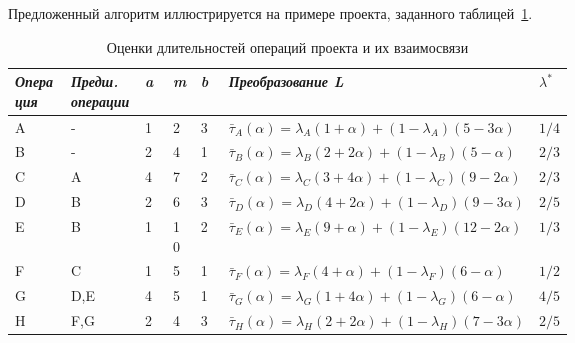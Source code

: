 Предложенный алгоритм иллюстрируется на примере проекта, заданного таблицей~\ref{t:sample-project-estimates}.
\begin{table}[h!]
\caption{Оценки длительностей операций проекта и их взаимосвязи}
\label{t:sample-project-estimates}
\begin{center}
\begin{tabularx}{\textwidth}{|p{0.1\linewidth}|X|p{0.05\linewidth}|p{0.05\linewidth}|p{0.05\linewidth}|p{0.4\linewidth}|X|}
	\hline
		\centering \textit{Операция} & \centering \textit{Предш. операции} & \centering \textit{a} & \centering \textit{m} & \centering \textit{b}  & \centering \textit{Преобразование L} & \centering $\lambda^*$ \tabularnewline	\hline
	\hline
		A & -   & 1 & 2  & 3 & $\bar{\tau}_A\left( \alpha \right)=\lambda_A\left( 1+\alpha \right)+\left( 1-\lambda_A \right)\left( 5-3\alpha \right)$ & $1/4$ \tabularnewline \hline
		B & -   & 2 & 4  & 1 & $\bar{\tau}_B\left( \alpha \right)=\lambda_B\left( 2+2\alpha \right)+\left( 1-\lambda_B \right)\left( 5-\alpha \right)$ & $2/3$ \tabularnewline \hline
		C & A   & 4 & 7  & 2 & $\bar{\tau}_C\left( \alpha \right)=\lambda_C\left( 3+4\alpha \right)+\left( 1-\lambda_C \right)\left( 9-2\alpha \right)$ & $2/3$ \tabularnewline \hline
		D & B   & 2 & 6  & 3 & $\bar{\tau}_D\left( \alpha \right)=\lambda_D\left( 4+2\alpha \right)+\left( 1-\lambda_D \right)\left( 9-3\alpha \right)$ & $2/5$ \tabularnewline \hline
		E & B   & 1 & 10 & 2 & $\bar{\tau}_E\left( \alpha \right)=\lambda_E\left( 9+\alpha \right)+\left( 1-\lambda_E \right)\left( 12-2\alpha \right)$ & $1/3$ \tabularnewline \hline
		F & C   & 1 & 5  & 1 & $\bar{\tau}_F\left( \alpha \right)=\lambda_F\left( 4+\alpha \right)+\left( 1-\lambda_F \right)\left( 6-\alpha \right)$ & $1/2$ \tabularnewline \hline
		G & D,E & 4 & 5  & 1 & $\bar{\tau}_G\left( \alpha \right)=\lambda_G\left( 1+4\alpha \right)+\left( 1-\lambda_G \right)\left( 6-\alpha \right)$ & $4/5$ \tabularnewline \hline
		H & F,G & 2 & 4  & 3 & $\bar{\tau}_H\left( \alpha \right)=\lambda_H\left( 2+2\alpha \right)+\left( 1-\lambda_H \right)\left( 7-3\alpha \right)$ & $2/5$ \tabularnewline
    \hline
\end{tabularx}
\end{center}
\end{table}

